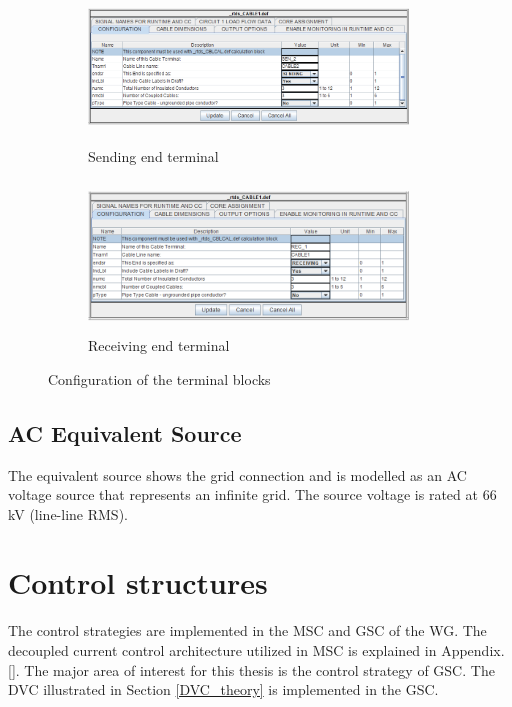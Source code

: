 \begin{figure}[H]
\centering
\begin{subfigure}{0.5\textwidth}
  \centering
  \includegraphics[height = 4cm,width = 8.5cm]{Diagrams/Chapter_3/CableParaBlock_sen_term.PNG}
  \caption{Sending end terminal}
  \label{fig:CableParaBlock_sen_term}
\end{subfigure}%
\begin{subfigure}{0.5\textwidth}
  \centering
  \includegraphics[height = 4cm,width = 8.5cm]{Diagrams/Chapter_3/CableParaBlock_rec_term.PNG}
  \caption{Receiving end terminal}
  \label{fig:CableParaBlock_rec_term}
\end{subfigure}
\caption{Configuration of the terminal blocks}
\label{fig:Terminal_options}
\end{figure}

\subsection{AC Equivalent Source}
The equivalent source shows the grid connection and is modelled as an \gls{AC} voltage source that represents an infinite grid. The source voltage is rated at 66 kV (line-line RMS).

\section{Control structures}
The control strategies are implemented in the \gls{MSC} and \gls{GSC} of the \gls{WG}. The decoupled current control architecture utilized in \gls{MSC} is explained in Appendix.[]. The major area of interest for this thesis is the control strategy of \gls{GSC}. The \gls{DVC} illustrated in Section \ref{DVC_theory} is implemented in the \gls{GSC}.   

